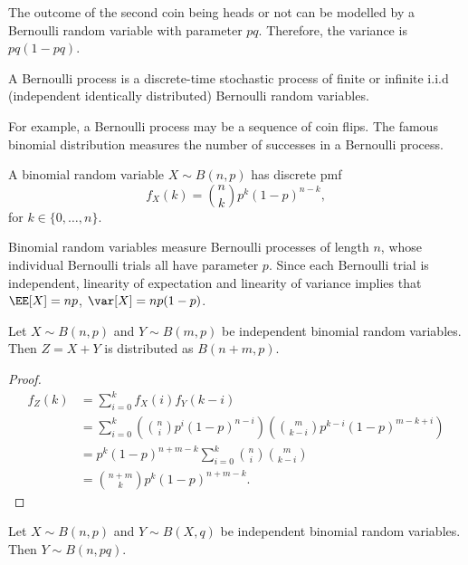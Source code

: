 The outcome of the second coin being heads or not can be modelled by a Bernoulli random variable with parameter $pq$. Therefore, the variance is $pq(1-pq)$. 

\begin{definition}

A \ac{Bernoulli process} is a discrete-time stochastic process of finite or infinite i.i.d (independent identically distributed) Bernoulli random variables. 
\end{definition}

For example, a Bernoulli process may be a sequence of coin flips. The famous binomial distribution measures the number of successes in a Bernoulli process. 

\begin{definition}

A \ac{binomial random variable} $X\sim B(n,p)$ has discrete pmf 
\[f_X(k) = \binom{n}{k}p^k(1-p)^{n-k},\]
for $k\in \{0,\hdots, n\}$.
\end{definition}

Binomial random variables measure Bernoulli processes of length $n$, whose individual Bernoulli trials all have parameter $p$. Since each Bernoulli trial is independent, linearity of expectation and linearity of variance implies that $\EE[X] = np$, $\var[X] = np(1-p)$. 

\begin{theorem}
\lemlabel

Let $X\sim B(n,p)$ and $Y\sim B(m,p)$ be independent binomial random variables. Then $Z = X+Y$ is distributed as $B(n+m, p)$. 
\end{theorem}

\begin{proof}
\begin{align*}
    f_Z(k) &= \sum_{i=0}^{k}f_X(i)f_Y(k-i) \\ 
    &= \sum_{i=0}^k \left(\binom{n}{i}p^i(1-p)^{n-i}\right)\left(\binom{m}{k-i}p^{k-i}(1-p)^{m-k+i}\right) \\
    &= p^k(1-p)^{n+m-k}\sum_{i=0}^k \binom{n}{i}\binom{m}{k-i} \\
    &= \binom{n+m}{k}p^k(1-p)^{n+m-k}.
\end{align*}
\end{proof}

\begin{theorem}
\lemlabel

Let $X\sim B(n,p)$ and $Y\sim B(X,q)$ be independent binomial random variables. Then $Y\sim B(n, pq)$. 
\end{theorem}

